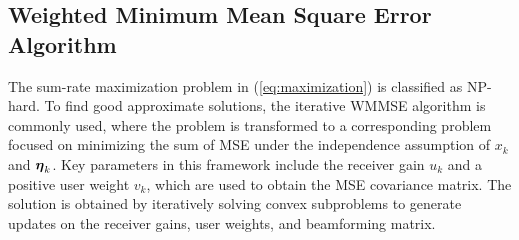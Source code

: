 \subsection{Weighted Minimum Mean Square Error Algorithm}
The sum-rate maximization problem in (\ref{eq:maximization}) is classified as NP-hard. To find good approximate solutions, the iterative \gls{WMMSE} algorithm \cite{shi2011iteratively} is commonly used, where the problem is transformed to a corresponding problem focused on minimizing the sum of \gls{MSE} under the independence assumption of $x_k$ and $\boldsymbol{\eta}_k$. 
Key parameters in this framework include the receiver gain $u_k$ and a positive user weight $v_k$, which are used to obtain the \gls{MSE} covariance matrix. 
The solution is obtained by iteratively solving convex subproblems to generate updates on the receiver gains, user weights, and beamforming matrix.

